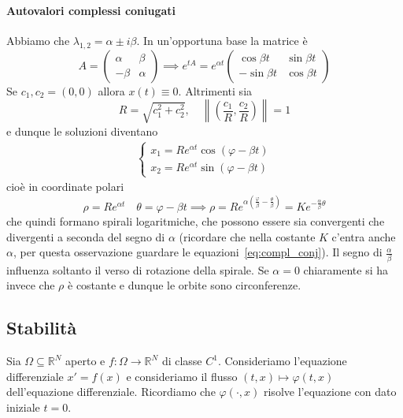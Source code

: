 \paragraph{Autovalori complessi coniugati} Abbiamo che \(\lambda_{1,2} = \alpha
\pm i \beta\). In un'opportuna base la matrice è
\[
  A = \begin{pmatrix}
      \alpha & \beta \\
      -\beta & \alpha
  \end{pmatrix} \implies e^{t A} = e^{\alpha t} \begin{pmatrix}
      \cos \beta t & \sin \beta t \\  
      -\sin \beta t & \cos \beta t
  \end{pmatrix}
\]
Se \(c_{1}, c_{2} = {(0, 0)}\) allora \(x{(t)} \equiv 0\). Altrimenti sia
\[
  R = \sqrt{c_{1}^2 + c_{2}^2} ,\quad \left\|{\left(\frac{c_{1}}{R},
      \frac{c_{2}}{R}\right)}\right\| =
  1
\]
e dunque le soluzioni diventano
\begin{align}\label{eq:compl_conj}
  \begin{cases}
      x_{1} = R e^{\alpha t} \cos{(\varphi  - \beta t)} \\
      x_{2} = R e^{\alpha t} \sin{(\varphi  - \beta t)}
  \end{cases}
\end{align}
cioè in coordinate polari 
\[
  \rho = R e^{\alpha t} \quad \theta = \varphi - \beta t \implies \rho = R e
  ^{\alpha {\left( \frac{\varphi}{\beta} - \frac{\theta}{\beta} \right)} } =
  Ke^{-\frac{\alpha}{\beta}\theta}
\]
che quindi formano spirali logaritmiche, che possono essere sia convergenti che
divergenti a seconda del segno di \(\alpha\) (ricordare che nella costante \(K\)
c'entra anche \(\alpha\), per questa osservazione guardare le
equazioni~\eqref{eq:compl_conj}). Il segno di \(\frac{\alpha}{\beta}\) influenza
soltanto il verso di rotazione della spirale. Se \(\alpha = 0\) chiaramente si
ha invece che \(\rho\) è costante e dunque le orbite sono circonferenze.

\subsection{Stabilità}
Sia \(\Omega \subseteq \mathbb{R}^{N} \) aperto e \(f : \Omega \to
\mathbb{R}^{N}\) di classe \(C^{1}\). Consideriamo l'equazione differenziale
\(x'=  f{(x)}\) e consideriamo il flusso \({(t,x)} \mapsto \varphi {(t, x)}\)
dell'equazione differenziale. Ricordiamo che \(\varphi {(\cdot , x)}\) risolve
l'equazione con dato iniziale \(t = 0\).

